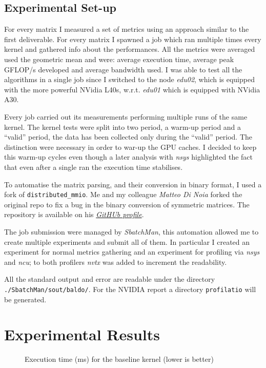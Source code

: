 \documentclass[conference]{IEEEtran}
\begin{document}
\subsection{Experimental Set-up}

For every matrix I measured a set of metrics using an approach similar to the first deliverable. For every matrix I spawned a job which ran multiple times every kernel and gathered info about the performances. All the metrics were averaged used the geometric mean and were: average execution time, average peak GFLOP/s developed and average bandwidth used. I was able to test all the algorithms in a single job since I switched to the node \emph{edu02}, which is equipped with the more powerful NVidia L40s, w.r.t. \emph{edu01} which is equipped with NVidia A30.

Every job carried out its measurements performing multiple runs of the same kernel. The kernel tests were split into two period, a warm-up period and a ``valid'' period, the data has been collected only during the ``valid'' period. The distinction were necessary in order to war-up the GPU caches. I decided to keep this warm-up cycles even though a later analysis with \emph{nsys} highlighted the fact that even after a single ran the execution time stabilises.

To automatise the matrix parsing, and their conversion in binary format, I used a fork of \texttt{distributed\_mmio}. Me and my colleague \emph{Matteo Di Noia} forked the original repo to fix a bug in the binary conversion of symmetric matrices. The repository is available on his \href{https://github.com/matteo-dinoia/distributed_mmio}{\emph{GitHUb profile}}.

The job submission were managed by \emph{SbatchMan}, this automation allowed me to create multiple experiments and submit all of them. In  particular I created an experiment for normal metrics gathering and an experiment for profiling via \emph{nsys} and \emph{ncu}; to both profilers \emph{nvtx} was added to increment the readability.

All the standard output and error are readable under the directory \texttt{./SbatchMan/sout/baldo/}. For the NVIDIA report a directory \texttt{profilatio} will be generated.

\section{Experimental Results}\label{sec:result}
\begin{figure}[ht]
    \centering
    
    \caption{Execution time (ms) for the baseline kernel (lower is better)}
    \label{fig:avg-exec-time-baseline}
\end{figure}
\end{document}
